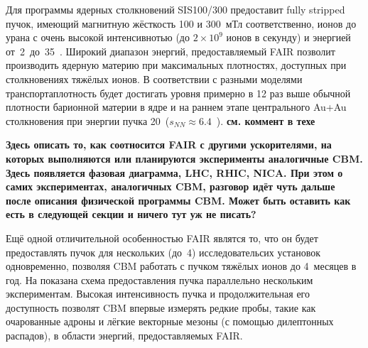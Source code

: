 Для программы ядерных столкновений SIS100/300 предоставит fully stripped \todo пучок, имеющий магнитную жёсткость 100 и 300~мТл соответственно, ионов до урана с очень высокой интенсивнотью (до $2 \times 10^9$ ионов в секунду) и энергией от~2~до~35~\GeVperNucl.
Широкий диапазон энергий, предоставляемый FAIR позволит производить ядерную материю при максимальных плотностях, доступных при столкновениях тяжёлых ионов. В соответствии с разными моделями транспорта\todo плотность будет достигать уровня примерно в 12 раз выше обычной плотности барионной материи в ядре и на раннем этапе центрального Au+Au столкновения при энергии пучка 20~\GeVperNucl ($s_{NN} \approx 6.4$~\GeV). \todo \textbf{см. коммент в техе}


\todo \textbf{Здесь описать то, как соотносится FAIR с другими ускорителями, на которых выполняются или планируются эксперименты аналогичные CBM. Здесь появляется фазовая диаграмма, LHC, RHIC, NICA. При этом о самих экспериментах, аналогичных CBM, разговор идёт чуть дальше после описания физической программы CBM. Может быть оставить как есть в следующей секции и ничего тут уж не писать?}

Ещё одной отличительной особенностью FAIR являтся то, что он будет предоставлять пучок для нескольких (до~4) исследовательсих установок одновременно, позволяя CBM работать с пучком тяжёлых ионов до 4~месяцев в год. На  показана схема предоставления пучка параллельно нескольким экспериментам.
Высокая интенсивность пучка и продолжительная его доступность позволят CBM впервые измерять редкие пробы, такие как очарованные адроны и лёгкие векторные мезоны (с помощью дилептонных распадов), в области энергий, предоставляемых FAIR.

